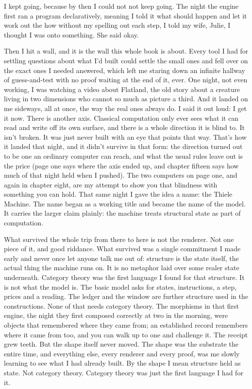 \documentclass[11pt,twoside]{article}
\theoremstyle{thielethm}
\theoremstyle{thieledef}
\theoremstyle{thieledef}
\theoremstyle{thieledef}
\theoremstyle{thielethm}
\theoremstyle{thieleobs}
\theoremstyle{thielethm}
\begin{document}
I kept going, because by then I could not not keep going. The night the engine first ran a program declaratively, meaning I told it what should happen and let it work out the how without my spelling out each step, I told my wife, Julie, I thought I was onto something. She said okay.

Then I hit a wall, and it is the wall this whole book is about. Every tool I had for settling questions about what I'd built could settle the small ones and fell over on the exact ones I needed answered, which left me staring down an infinite hallway of guess-and-test with no proof waiting at the end of it, ever. One night, not even working, I was watching a video about Flatland, the old story about a creature living in two dimensions who cannot so much as picture a third. And it landed on me sideways, all at once, the way the real ones always do. I said it out loud: I get it now. There is another axis. Classical computation only ever sees what it can read and write off its own surface, and there is a whole direction it is blind to. It isn't broken. It was just never built with an eye that points that way. That's how it landed that night, and it didn't survive in that form: the direction turned out to be one an ordinary computer can reach, and what the usual rules leave out is the price (page one says where the axis ended up, and chapter fifteen says how much of that night held when I pushed). The two computers on page one, and again in chapter eight, are my attempt to show you that blindness with something you can hold. That same night I gave the idea a name: the Thiele Machine. The name began as a working title and became the name of the model. It carries the larger claim plainly: the machine treats structural state as part of computation.

What survived the whole trip from there to here is not the renderer. Not one piece of it, and good riddance. What survived was a single commitment I made early and never once let anyone talk me out of: structure is the state itself, the actual thing the machine runs on. It is no metaphor laid over some realer state underneath. Category theory was the first language I found for that structure. It is not what the model is. The basic model asks for states, instructions, a step, prices and a reading. The ledger and the window are further structure used in the constructions. None of that needs category theory. The morphisms in that first engine, the night they first composed correctly at two in the morning, were objects that remembered where they came from; an established record remembers where it came from too, and you can walk up to one and challenge it. The receipt grew teeth. But the shape itself never moved. The shape was the substrate the entire time, and everything else, every renderer and every proof, was me slowly learning to see what I had already built. By the shape I mean structure held as state. Not category theory. Category theory was just the first language I had for it.
\end{document}
